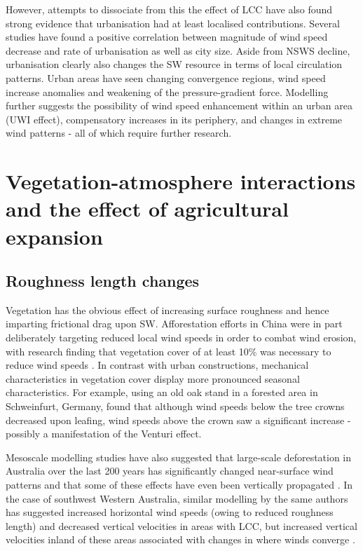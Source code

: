 However, attempts to dissociate from this the effect of \ac{LCC} have also found strong evidence that urbanisation had at least localised contributions. Several studies have found a positive correlation between magnitude of wind speed decrease and rate of urbanisation as well as city size. Aside from \ac{NSWS} decline, urbanisation clearly also changes the SW resource in terms of local circulation patterns. Urban areas have seen changing convergence regions, wind speed increase anomalies and weakening of the pressure-gradient force. Modelling further suggests the possibility of wind speed enhancement within an urban area (\ac{UWI} effect), compensatory increases in its periphery, and changes in extreme wind patterns - all of which require further research.

\section[Vegetation-atmosphere interactions]{Vegetation-atmosphere interactions and the effect of agricultural expansion}

\subsection{Roughness length changes}

Vegetation has the obvious effect of increasing surface roughness and hence imparting frictional drag upon \ac{SW}. Afforestation efforts in China were in part deliberately targeting reduced local wind speeds in order to combat wind erosion, with research finding that vegetation cover of at least 10\% was necessary to reduce wind speeds \citep{jiang2019}. In contrast with urban constructions, mechanical characteristics in vegetation cover display more pronounced seasonal characteristics. For example, using an old oak stand in a forested area in Schweinfurt, Germany, \citet{geiger1950} found that although wind speeds below the tree crowns decreased upon leafing, wind speeds above the crown saw a significant increase - possibly a manifestation of the Venturi effect.

Mesoscale modelling studies have also suggested that large-scale deforestation in Australia over the last 200 years has significantly changed near-surface wind patterns and that some of these effects have even been vertically propagated \citep{narisma2003}. In the case of southwest Western Australia, similar modelling by the same authors has suggested increased horizontal wind speeds (owing to reduced roughness length) and decreased vertical velocities in areas with \ac{LCC}, but increased vertical velocities inland of these areas associated with changes in where winds converge \citep{pitman2004}.

